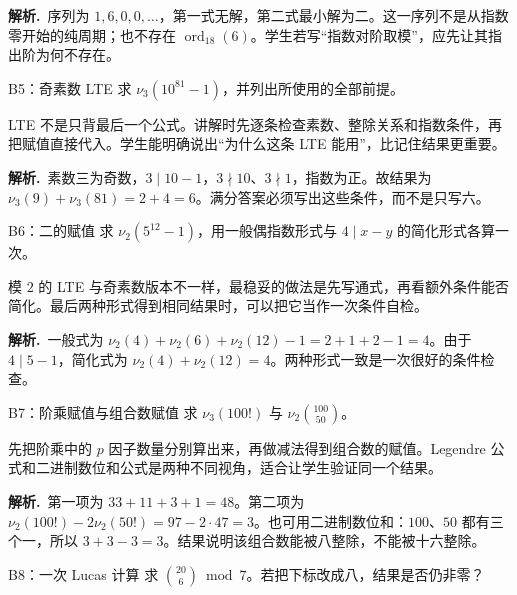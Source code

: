 \documentclass[UTF8,a4paper,11pt,twoside,openright,fontset=fandol]{ctexbook}
\theoremstyle{definition}
\newcommand{\ord}{\operatorname{ord}}
\newcommand{\sol}{\par\noindent\textbf{解析.}\ }
\begin{document}
\sol 序列为 $1,6,0,0,\ldots$，第一式无解，第二式最小解为二。这一序列不是从指数零开始的纯周期；也不存在 $\ord_{18}(6)$。学生若写“指数对阶取模”，应先让其指出阶为何不存在。


\begin{problem}{B5：奇素数 LTE}
求 $\nu_3(10^{81}-1)$，并列出所使用的全部前提。
\end{problem}

\begin{pitfall}[讲解：先看这题到底在做什么]
LTE 不是只背最后一个公式。讲解时先逐条检查素数、整除关系和指数条件，再把赋值直接代入。学生能明确说出“为什么这条 LTE 能用”，比记住结果更重要。
\end{pitfall}

\sol 素数三为奇数，$3\mid10-1$，$3\nmid10$、$3\nmid1$，指数为正。故结果为 $\nu_3(9)+\nu_3(81)=2+4=6$。满分答案必须写出这些条件，而不是只写六。


\begin{problem}{B6：二的赋值}
求 $\nu_2(5^{12}-1)$，用一般偶指数形式与 $4\mid x-y$ 的简化形式各算一次。
\end{problem}

\begin{pitfall}[讲解：先看这题到底在做什么]
模 $2$ 的 LTE 与奇素数版本不一样，最稳妥的做法是先写通式，再看额外条件能否简化。最后两种形式得到相同结果时，可以把它当作一次条件自检。
\end{pitfall}

\sol 一般式为 $\nu_2(4)+\nu_2(6)+\nu_2(12)-1=2+1+2-1=4$。由于 $4\mid5-1$，简化式为 $\nu_2(4)+\nu_2(12)=4$。两种形式一致是一次很好的条件检查。


\begin{problem}{B7：阶乘赋值与组合数赋值}
求 $\nu_3(100!)$ 与 $\nu_2\binom{100}{50}$。
\end{problem}

\begin{pitfall}[讲解：先看这题到底在做什么]
先把阶乘中的 $p$ 因子数量分别算出来，再做减法得到组合数的赋值。Legendre 公式和二进制数位和公式是两种不同视角，适合让学生验证同一个结果。
\end{pitfall}

\sol 第一项为 $33+11+3+1=48$。第二项为 $\nu_2(100!)-2\nu_2(50!)=97-2\cdot47=3$。也可用二进制数位和：$100$、$50$ 都有三个一，所以 $3+3-3=3$。结果说明该组合数能被八整除，不能被十六整除。


\begin{problem}{B8：一次 Lucas 计算}
求 $\binom{20}{6}\bmod7$。若把下标改成八，结果是否仍非零？
\end{problem}
\end{document}
